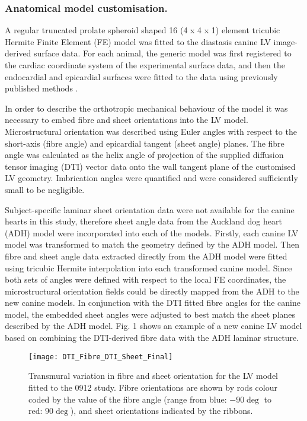 \documentclass{llncs}
\begin{document}
\subsubsection{Anatomical model customisation.} 
A regular truncated prolate spheroid shaped 16 (4 x 4 x 1) element tricubic Hermite Finite Element (FE) model was fitted to the diastasis canine LV image-derived surface data. For each animal, the generic model was first registered to the cardiac coordinate system of the experimental surface data, and then the endocardial and epicardial surfaces were fitted to the data using previously published methods \cite{Wang}. 

In order to describe the orthotropic mechanical behaviour of the model it was necessary to embed fibre and sheet orientations into the LV model. Microstructural orientation was described using Euler angles with respect to the short-axis (fibre angle) and epicardial tangent (sheet angle) planes. The fibre angle was calculated as the helix angle of projection of the supplied diffusion tensor imaging (DTI) vector data onto the wall tangent plane of the customised LV geometry. Imbrication angles were quantified and were considered sufficiently small to be negligible. 

Subject-specific laminar sheet orientation data were not available for the canine hearts in this study, therefore sheet angle data from the Auckland dog heart (ADH) model \cite{LeGrice} were incorporated into each of the models. Firstly, each canine LV model was transformed to match the geometry defined by the ADH model. Then fibre and sheet angle data extracted directly from the ADH model were fitted using tricubic Hermite interpolation into each transformed canine model. Since both sets of angles were defined with respect to the local FE coordinates, the microstructural orientation fields could be directly mapped from the ADH to the new canine models. In conjunction with the DTI fitted fibre angles for the canine model, the embedded sheet angles were adjusted to best match the sheet planes described by the ADH model. Fig. 1 shows an example of a new canine LV model based on combining the DTI-derived fibre data with the ADH laminar structure. 

\begin{figure}[H]
	\centering
	\caption[]{Transmural variation in fibre and sheet orientation for the LV model fitted to the 0912 study. Fibre orientations are shown by rods colour coded by the value of the fibre angle (range from blue: $-90\deg$ to red: $90\deg$), and sheet orientations indicated by the ribbons.}
	\texttt{[image: DTI\_Fibre\_DTI\_Sheet\_Final]}
\end{figure}
\end{document}
